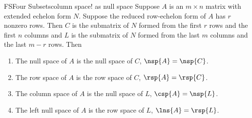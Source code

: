 %
\begin{theorem}{FS}{Four Subsets}{column space! as null space}
Suppose $A$ is an $m\times n$ matrix with extended echelon form $N$.  Suppose the reduced row-echelon form of $A$ has $r$ nonzero rows.  Then $C$ is the submatrix of $N$ formed from the first $r$ rows and the first $n$ columns and $L$ is the submatrix of $N$ formed from the last $m$ columns and the last $m-r$ rows.  Then 
%
\begin{enumerate}
\item The null space of $A$ is the null space of $C$, $\nsp{A}=\nsp{C}$.
\item The row space of $A$ is the row space of $C$, $\rsp{A}=\rsp{C}$.
\item The column space of $A$ is the null space of $L$, $\csp{A}=\nsp{L}$.
\item The left null space of $A$ is the row space of $L$, $\lns{A}=\rsp{L}$.
\end{enumerate}
%
\end{theorem}
%
